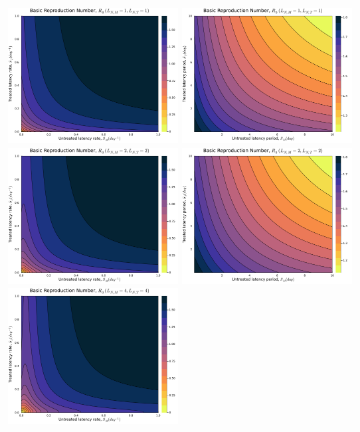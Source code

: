 \documentclass[11pt]{article}
\begin{document}
\begin{figure}[H]
  \centering
  \includegraphics[width=0.4\textwidth]{../../fig/R0_rates_SMxST_1x1_cal.pdf}
  \includegraphics[width=0.4\textwidth]{../../fig/R0_periods_SMxST_1x1_cal.pdf}\\
  \includegraphics[width=0.4\textwidth]{../../fig/R0_rates_SMxST_2x2_cal.pdf}
  \includegraphics[width=0.4\textwidth]{../../fig/R0_periods_SMxST_2x2_cal.pdf}\\
  \includegraphics[width=0.4\textwidth]{../../fig/R0_rates_SMxST_4x4_cal.pdf}

\end{figure}
\end{document}
